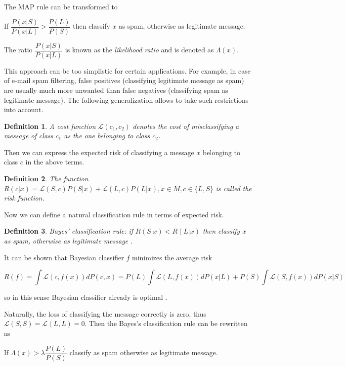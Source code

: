 \documentclass[12pt]{report}
\newcommand{\Loss}{\mathcal{L}}
\newtheorem{definition}{Definition}[section]
\begin{document}
The MAP rule can be transformed to

\begin{center}
	If $\dfrac{P(x | S)}{P(x | L)} > \dfrac{P(L)}{P(S)}$ then classify $x$ as spam, otherwise as legitimate message.
\end{center}

The ratio $\dfrac{P(x | S)}{P(x | L)}$ is known as the \textit{likelihood ratio} and is denoted as $\Lambda(x)$.

This approach can be too simplistic for certain applications. For example, in case of e-mail spam filtering, false positives (classifying legitimate message as spam) are usually much more unwanted than false negatives (classifying spam as legitimate message). The following generalization allows to take such restrictions into account.

\begin{definition}
	A cost function $\Loss(c_1, c_2)$ denotes the cost of misclassifying a message of class $c_1$ as the one belonging to class $c_2$.
\end{definition}

Then we can express the expected risk of classifying a message $x$ belonging to class $c$ in the above terms.

\begin{definition}
	The function $R(c | x) = \Loss(S, c) P(S |x) + \Loss(L, c) P(L | x), x \in M, c \in \{L, S\}$ is called the risk function.
\end{definition}

Now we can define a natural classification rule in terms of expected risk.

\begin{definition}
	Bayes' classification rule: if $R(S | x) < R(L | x)$ then classify $x$ as spam, otherwise as legitimate message \cite{Kecman}.
\end{definition}

It can be shown that Bayesian classifier $f$ minimizes the average risk

$$R(f) = \int \Loss(c, f(x)) dP(c, x) = P(L) \int \Loss(L, f(x))dP(x | L) + P(S) \int \Loss(S, f(x))dP(x | S)$$

so in this sense Bayesian classifier already is optimal \cite{Tretyakov}.

Naturally, the loss of classifying the message correctly is zero, thus $\Loss(S, S) = \Loss(L, L) = 0$. Then the Bayes's classification rule can be rewritten as

\begin{center}
	If $\Lambda(x) > \lambda \dfrac{P(L)}{P(S)}$ classify as spam otherwise as legitimate message.
\end{center}
\end{document}

